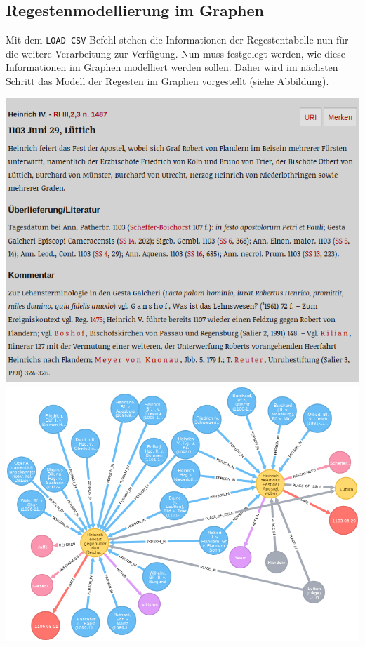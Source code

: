 \documentclass[ngerman,]{scrreprt}
\begin{document}
\subsection{Regestenmodellierung im Graphen}\label{regestenmodellierung-im-graphen-1}

Mit dem \texttt{LOAD\ CSV}-Befehl stehen die Informationen der Regestentabelle nun für die weitere Verarbeitung zur Verfügung. Nun muss festgelegt werden, wie diese Informationen im Graphen modelliert werden sollen. Daher wird im nächsten Schritt das Modell der Regesten im Graphen vorgestellt (siehe Abbildung).

\includegraphics{Bilder/RI2Graph/ReggH4-Nr-1487.png} \includegraphics{Bilder/RI2Graph/ReggH4-Nr-1487imGraph.png}
\end{document}
